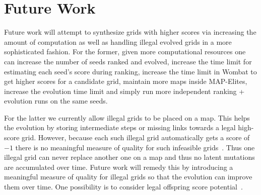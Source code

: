\section{Future Work}

Future work will attempt to synthesize grids with higher scores via increasing the amount of computation as well as handling illegal evolved grids in a more sophisticated fashion. For the former, given more computational resources one can increase the number of seeds ranked and evolved, increase the time limit for estimating each seed's score during ranking, increase the time limit in {\sc Wombat} to get higher scores for a candidate grid, maintain more maps inside MAP-Elites, increase the evolution time limit and simply run more independent ranking + evolution runs on the same seeds. 

For the latter we currently allow illegal grids to be placed on a map. This helps the evolution by storing intermediate steps or missing links towards a legal high-score grid. However, because each such illegal grid automatically gets a score of $-1$ there is no meaningful measure of quality for such infeasible grids~\cite{FI2Pop}. Thus one illegal grid can never replace another one on a map and thus no latent mutations are accumulated over time. Future work will remedy this by introducing a meaningful measure of quality for illegal grids so that the evolution can improve them over time. One possibility is to consider legal offspring score potential~\cite{Gallotta_2022}.
